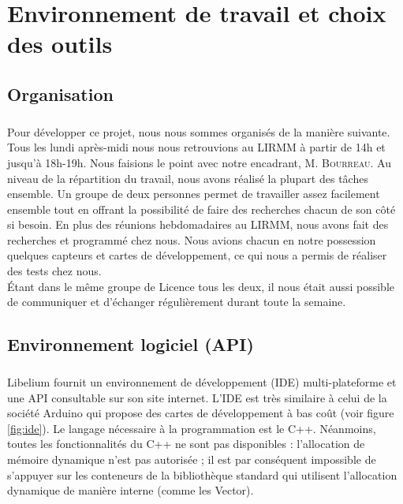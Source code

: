 \chapter{Environnement de travail et choix des outils}
\label{sec:env}

\section{Organisation}
    \paragraph{} Pour développer ce projet, nous nous sommes organisés de la manière suivante. Tous les lundi après-midi nous nous retrouvions au LIRMM à partir de 14h et jusqu'à 18h-19h. Nous faisions le point avec notre encadrant, M. \textsc{Bourreau}. Au niveau de la répartition du travail, nous avons réalisé la plupart des tâches ensemble. Un groupe de deux personnes permet de travailler assez facilement ensemble tout en offrant la possibilité de faire des recherches chacun de son côté si besoin. En plus des réunions hebdomadaires au LIRMM, nous avons fait des recherches et programmé chez nous. Nous avions chacun en notre possession quelques capteurs et cartes de développement, ce qui nous a permis de réaliser des tests chez nous.\\
    Étant dans le même groupe de Licence tous les deux, il nous était aussi possible de communiquer et d'échanger régulièrement durant toute la semaine.


\section{Environnement logiciel (API)}
    \paragraph{}Libelium fournit un environnement de développement (IDE) multi-plateforme et une API consultable sur son site internet. L'IDE est très similaire à celui de la société Arduino qui propose des cartes de développement à bas coût (voir figure \ref{fig:ide}). Le langage nécessaire à la programmation est le C++. Néanmoins, toutes les fonctionnalités du C++ ne sont pas disponibles : l'allocation de mémoire dynamique n'est pas autorisée ; il est par conséquent impossible de s'appuyer sur les conteneurs de la bibliothèque standard qui utilisent l'allocation dynamique de manière interne (comme les Vector). 
    
